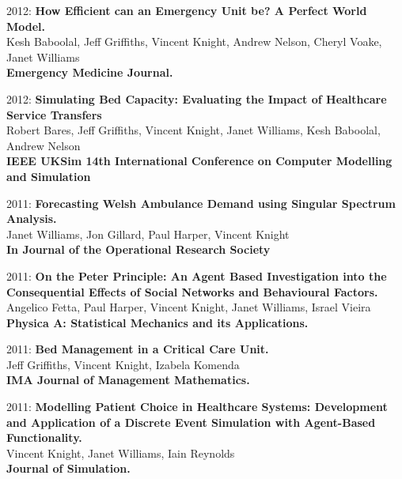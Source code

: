 \documentclass[10pt]{res} %
\begin{document}
\begin{resume}
\begin{etaremune}
\item
2012: \textbf{How Efficient can an Emergency Unit be? A Perfect World Model.}\\
Kesh Baboolal, Jeff Griffiths, Vincent Knight, Andrew Nelson, Cheryl Voake, Janet Williams
\\
\textbf{Emergency Medicine Journal.}
\\

\item
2012: \textbf{Simulating Bed Capacity: Evaluating the Impact of Healthcare Service Transfers}\\
Robert Bares, Jeff Griffiths, Vincent Knight, Janet Williams, Kesh Baboolal, Andrew Nelson
\\
\textbf{IEEE UKSim 14th International Conference on Computer Modelling and Simulation}
\\

\item
2011: \textbf{Forecasting Welsh Ambulance Demand using Singular Spectrum Analysis.}\\
Janet Williams, Jon Gillard, Paul Harper, Vincent Knight
\\
\textbf{In Journal of the Operational Research Society}
\\

\item
2011: \textbf{On the Peter Principle: An Agent Based Investigation into the Consequential Effects of Social Networks and Behavioural Factors.}\\
Angelico Fetta, Paul Harper, Vincent Knight, Janet Williams, Israel Vieira
\\
\textbf{Physica A: Statistical Mechanics and its Applications.}
\\

\item
2011: \textbf{Bed Management in a Critical Care Unit.}\\
Jeff Griffiths, Vincent Knight, Izabela Komenda
\\
\textbf{IMA Journal of Management Mathematics.}
\\

\item
2011: \textbf{Modelling Patient Choice in Healthcare Systems: Development and Application of a Discrete Event Simulation with Agent-Based Functionality.}\\
Vincent Knight, Janet Williams, Iain Reynolds
\\
\textbf{Journal of Simulation.}
\\


\end{etaremune}
\end{resume}
\end{document}
